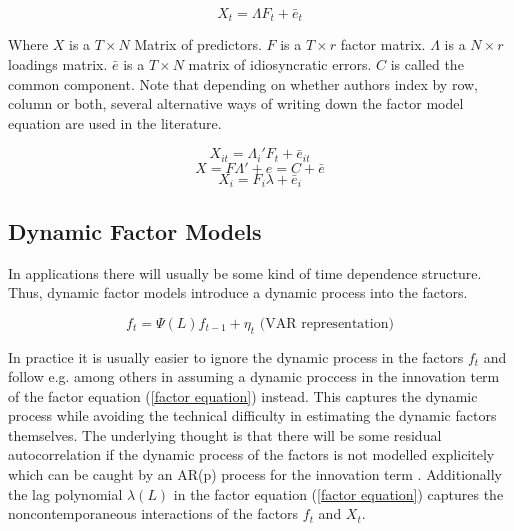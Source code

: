 \documentclass[11pt]{article}
\begin{document}
\begin{equation}
	\label{factor equation, t indexed}
	X_t = \Lambda F_t + \bar e_t
\end{equation}

Where $X$ is a $T \times N$ Matrix of predictors. $F$ is a $T \times r$ factor matrix. $\Lambda$ is a $N \times r$ loadings matrix. $\bar e$ is a $T \times N$ matrix of idiosyncratic errors. $C$ is called the common component.
Note that depending on whether authors index by row, column or both, several alternative ways of writing down the factor model equation are used in the literature.

\begin{equation}
	\label{factor equation, it indexed}
	X_{it} = \Lambda_i' F_t + \bar e_{it}
\end{equation}
\begin{equation}
	\label{static factor equation}
	X = F \Lambda' + e = C + \bar e
\end{equation}
\begin{equation}
	\label{factor equation, i indexed}
	X_i = F_i \lambda + \bar e_i
\end{equation}





\subsection{Dynamic Factor Models}
In applications there will usually be some kind of time dependence structure. Thus, dynamic factor models introduce a dynamic process into the factors.

\begin{equation}
	\label{time dependence of factors}
	f_t = \Psi(L) f_{t-1} + \eta_t \text{\ \ \ \ \ (VAR representation)}
\end{equation}

In practice it is usually easier to ignore the dynamic process in the factors $f_t$ and follow e.g. \citet{stock2005implications} among others in assuming a dynamic proccess in the innovation term of the factor equation (\ref{factor equation}) instead. This captures the dynamic process while avoiding the technical difficulty in estimating the dynamic factors themselves. The underlying thought is that there will be some residual autocorrelation if the dynamic process of the factors is not modelled explicitely which can be caught by an AR(p) process for the innovation term \citep{breitung2011gls}. Additionally the lag polynomial $\lambda(L)$ in the factor equation (\ref{factor equation}) captures the noncontemporaneous interactions of the factors $f_t$ and $X_t$.
\end{document}

